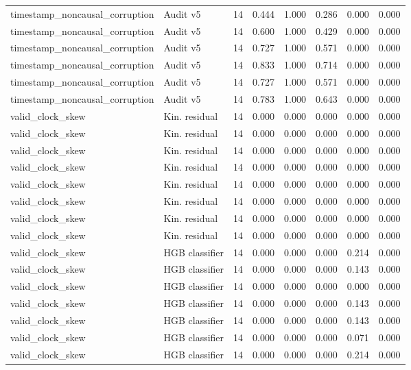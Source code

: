 {\begin{longtable}{llrrrrrr}
timestamp\_noncausal\_corruption & Audit v5 & 14 & 0.444 & 1.000 & 0.286 & 0.000 & 0.000 \\
timestamp\_noncausal\_corruption & Audit v5 & 14 & 0.600 & 1.000 & 0.429 & 0.000 & 0.000 \\
timestamp\_noncausal\_corruption & Audit v5 & 14 & 0.727 & 1.000 & 0.571 & 0.000 & 0.000 \\
timestamp\_noncausal\_corruption & Audit v5 & 14 & 0.833 & 1.000 & 0.714 & 0.000 & 0.000 \\
timestamp\_noncausal\_corruption & Audit v5 & 14 & 0.727 & 1.000 & 0.571 & 0.000 & 0.000 \\
timestamp\_noncausal\_corruption & Audit v5 & 14 & 0.783 & 1.000 & 0.643 & 0.000 & 0.000 \\
valid\_clock\_skew & Kin. residual & 14 & 0.000 & 0.000 & 0.000 & 0.000 & 0.000 \\
valid\_clock\_skew & Kin. residual & 14 & 0.000 & 0.000 & 0.000 & 0.000 & 0.000 \\
valid\_clock\_skew & Kin. residual & 14 & 0.000 & 0.000 & 0.000 & 0.000 & 0.000 \\
valid\_clock\_skew & Kin. residual & 14 & 0.000 & 0.000 & 0.000 & 0.000 & 0.000 \\
valid\_clock\_skew & Kin. residual & 14 & 0.000 & 0.000 & 0.000 & 0.000 & 0.000 \\
valid\_clock\_skew & Kin. residual & 14 & 0.000 & 0.000 & 0.000 & 0.000 & 0.000 \\
valid\_clock\_skew & Kin. residual & 14 & 0.000 & 0.000 & 0.000 & 0.000 & 0.000 \\
valid\_clock\_skew & Kin. residual & 14 & 0.000 & 0.000 & 0.000 & 0.000 & 0.000 \\
valid\_clock\_skew & HGB classifier & 14 & 0.000 & 0.000 & 0.000 & 0.214 & 0.000 \\
valid\_clock\_skew & HGB classifier & 14 & 0.000 & 0.000 & 0.000 & 0.143 & 0.000 \\
valid\_clock\_skew & HGB classifier & 14 & 0.000 & 0.000 & 0.000 & 0.000 & 0.000 \\
valid\_clock\_skew & HGB classifier & 14 & 0.000 & 0.000 & 0.000 & 0.143 & 0.000 \\
valid\_clock\_skew & HGB classifier & 14 & 0.000 & 0.000 & 0.000 & 0.143 & 0.000 \\
valid\_clock\_skew & HGB classifier & 14 & 0.000 & 0.000 & 0.000 & 0.071 & 0.000 \\
valid\_clock\_skew & HGB classifier & 14 & 0.000 & 0.000 & 0.000 & 0.214 & 0.000 \\

\end{longtable}}
